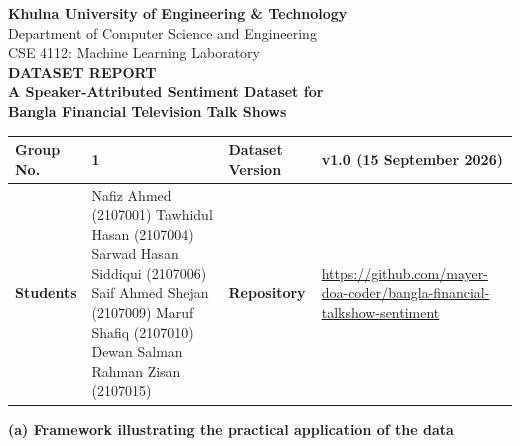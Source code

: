 \documentclass[11pt,a4paper]{article}
\newcommand{\thd}[1]{\textbf{\sffamily\small #1}}          %
\begin{document}
\thispagestyle{empty}
\begin{center}
  {\sffamily\large\bfseries Khulna University of Engineering \& Technology}\\[2pt]
  {\sffamily Department of Computer Science and Engineering}\\[2pt]
  {\sffamily CSE 4112: Machine Learning Laboratory}\\[10pt]
  {\sffamily\LARGE\bfseries DATASET REPORT}\\[8pt]
  {\large\bfseries A Speaker-Attributed Sentiment Dataset for\\
   Bangla Financial Television Talk Shows}\\[10pt]
\end{center}

\begin{center}
\begin{tabularx}{\textwidth}{|L{2.2cm}|Y|L{2.6cm}|Y|}
\hline
\thd{Group No.}  & \textbf{1}
& \thd{Dataset Version} & v1.0 (15 September 2026) \\ \hline
\thd{Students}   & \small Nafiz Ahmed (2107001) \textbullet{} Tawhidul Hasan (2107004) \textbullet{} Sarwad Hasan Siddiqui (2107006) \textbullet{} Saif Ahmed Shejan (2107009) \textbullet{} Maruf Shafiq (2107010) \textbullet{} Dewan Salman Rahman Zisan (2107015)
& \thd{Repository}      & {\scriptsize\url{https://github.com/mayer-doa-coder/bangla-financial-talkshow-sentiment}} \\ \hline
\end{tabularx}
\end{center}

\vspace{4pt}
{\sffamily\bfseries (a) Framework illustrating the practical application of the data}
\vspace{2pt}
\end{document}
